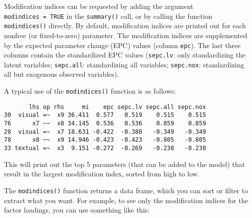 Modification indices can be requested by adding the argument
\texttt{modindices\ =\ TRUE} in the \texttt{summary()} call, or by
calling the function \texttt{modindices()} directly. By default,
modification indices are printed out for each nonfree (or fixed-to-zero)
parameter. The modification indices are supplemented by the expected
parameter change (EPC) values (column \texttt{epc}). The last three
columns contain the standardized EPC values (\texttt{sepc.lv}: only
standardizing the latent variables; \texttt{sepc.all}: standardizing all
variables; \texttt{sepc.nox}: standardizing all but exogenous observed
variables).

A typical use of the \texttt{modindices()} function is as follows:

\begin{Shaded}
\begin{Highlighting}[]
\OtherTok{\textless{}{-}} 
 \NormalTok{, } \NormalTok{)}
\end{Highlighting}
\end{Shaded}

\begin{verbatim}
       lhs op rhs     mi    epc sepc.lv sepc.all sepc.nox
30  visual =~  x9 36.411  0.577   0.519    0.515    0.515
76      x7 ~~  x8 34.145  0.536   0.536    0.859    0.859
28  visual =~  x7 18.631 -0.422  -0.380   -0.349   -0.349
78      x8 ~~  x9 14.946 -0.423  -0.423   -0.805   -0.805
33 textual =~  x3  9.151 -0.272  -0.269   -0.238   -0.238
\end{verbatim}

This will print out the top 5 parameters (that can be added to the
model) that result in the largest modification index, sorted from high
to low.

The \texttt{modindices()} function returns a data frame, which you can
sort or filter to extract what you want. For example, to see only the
modification indices for the factor loadings, you can use something like
this:

\begin{Shaded}
\begin{Highlighting}[]
\OtherTok{\textless{}{-}} 
\OtherTok{\textless{}{-}} 
\NormalTok{mi[mi}\SpecialCharTok{$}\SpecialCharTok{==} \NormalTok{,]}
\end{Highlighting}
\end{Shaded}

